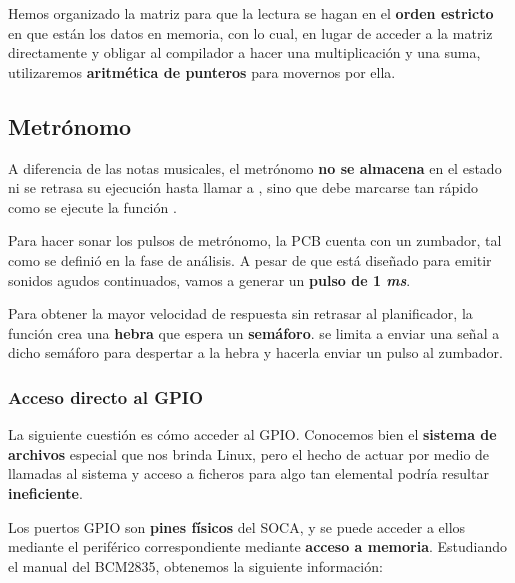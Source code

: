 Hemos organizado la matriz para que la lectura se hagan en el \textbf{orden estricto} en que están los datos en memoria, con lo cual, en lugar de acceder a la matriz directamente y obligar al compilador a hacer una multiplicación y una suma, utilizaremos \textbf{aritmética de punteros} para movernos por ella.

\subsection{Metrónomo}

A diferencia de las notas musicales, el metrónomo \textbf{no se almacena} en el estado ni se retrasa su ejecución hasta llamar a , sino que debe marcarse tan rápido como se ejecute la función .

Para hacer sonar los pulsos de metrónomo, la \acrshort{PCB} cuenta con un zumbador, tal como se definió en la fase de análisis. A pesar de que está diseñado para emitir sonidos agudos continuados, vamos a generar un \textbf{pulso de 1 \textit{ms}}.

Para obtener la mayor velocidad de respuesta sin retrasar al planificador, la función  crea una \textbf{hebra} que espera un \textbf{semáforo}.  se limita a enviar una señal a dicho semáforo para despertar a la hebra y hacerla enviar un pulso al zumbador.

\subsubsection{Acceso directo al GPIO}

La siguiente cuestión es cómo acceder al \acrshort{GPIO}. Conocemos bien el \textbf{sistema de archivos} especial que nos brinda Linux, pero el hecho de actuar por medio de llamadas al sistema y acceso a ficheros para algo tan elemental podría resultar \textbf{ineficiente}.

Los puertos \acrshort{GPIO} son \textbf{pines físicos} del \acrshort{SOCA}, y se puede acceder a ellos mediante el periférico correspondiente mediante \textbf{acceso a memoria}. Estudiando el manual del BCM2835, obtenemos la siguiente información:

\smallskip

